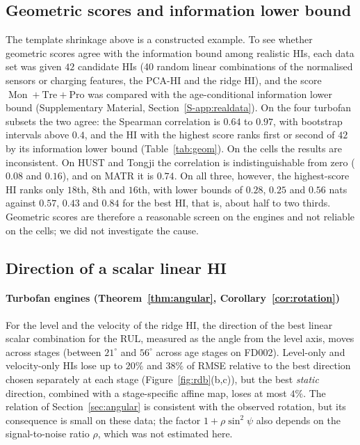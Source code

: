 \documentclass[preprint,12pt]{elsarticle}
\theoremstyle{definition}
\DeclareMathOperator{\Mon}{Mon}
\begin{document}
\subsection{Geometric scores and information lower bound}
The template shrinkage above is a constructed example. To see whether geometric scores agree with the information bound among realistic HIs, each data set was given $42$ candidate HIs (40 random linear combinations of the normalised sensors or charging features, the PCA-HI and the ridge HI), and the score $\Mon+\mathrm{Tre}+\mathrm{Pro}$ was compared with the age-conditional information lower bound (Supplementary Material, Section~\ref{S-app:realdata}). On the four turbofan subsets the two agree: the Spearman correlation is $0.64$ to $0.97$, with bootstrap intervals above $0.4$, and the HI with the highest score ranks first or second of $42$ by its information lower bound (Table~\ref{tab:geom}). On the cells the results are inconsistent. On HUST and Tongji the correlation is indistinguishable from zero ($0.08$ and $0.16$), and on MATR it is $0.74$. On all three, however, the highest-score HI ranks only $18$th, $8$th and $16$th, with lower bounds of $0.28$, $0.25$ and $0.56$ nats against $0.57$, $0.43$ and $0.84$ for the best HI, that is, about half to two thirds. Geometric scores are therefore a reasonable screen on the engines and not reliable on the cells; we did not investigate the cause.

\begin{table}[!t]
\caption{Geometric score versus information lower bound over $42$ candidate HIs per data set. $\rho_{\rm S}$: Spearman correlation with the information lower bound ($95\%$ bootstrap interval over HIs).}
\label{tab:geom}
\centering\scriptsize
{}
\end{table}

\subsection{Direction of a scalar linear HI}
\paragraph{Turbofan engines (Theorem~\ref{thm:angular}, Corollary~\ref{cor:rotation})} For the level and the velocity of the ridge HI, the direction of the best linear scalar combination for the RUL, measured as the angle from the level axis, moves across stages (between $21^\circ$ and $56^\circ$ across age stages on FD002). Level-only and velocity-only HIs lose up to $20\%$ and $38\%$ of RMSE relative to the best direction chosen separately at each stage (Figure~\ref{fig:rdb}(b,c)), but the best \emph{static} direction, combined with a stage-specific affine map, loses at most $4\%$. The relation of Section~\ref{sec:angular} is consistent with the observed rotation, but its consequence is small on these data; the factor $1+\rho\sin^2\psi$ also depends on the signal-to-noise ratio $\rho$, which was not estimated here.
\end{document}
